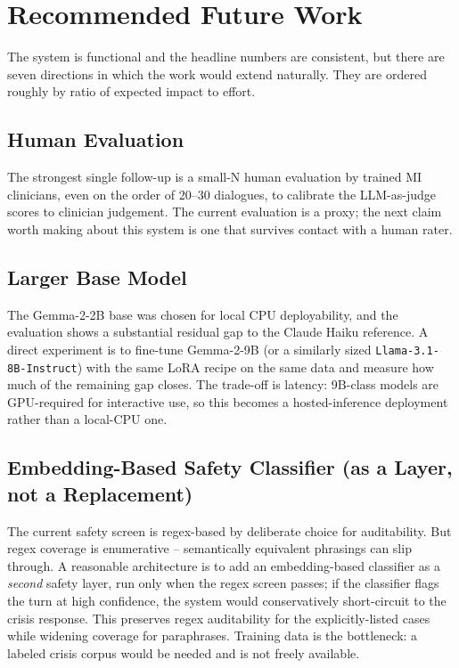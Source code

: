 \section{Recommended Future Work}
\label{sec:future_work}

The system is functional and the headline numbers are consistent, but there
are seven directions in which the work would extend naturally. They are
ordered roughly by ratio of expected impact to effort.

\subsection{Human Evaluation}
The strongest single follow-up is a small-N human evaluation by trained MI
clinicians, even on the order of 20--30 dialogues, to calibrate the
LLM-as-judge scores to clinician judgement. The current evaluation is a
proxy; the next claim worth making about this system is one that survives
contact with a human rater.

\subsection{Larger Base Model}
The Gemma-2-2B base was chosen for local CPU deployability, and the
evaluation shows a substantial residual gap to the Claude Haiku reference.
A direct experiment is to fine-tune Gemma-2-9B (or a similarly sized
\texttt{Llama-3.1-8B-Instruct}) with the same LoRA recipe on the same data
and measure how much of the remaining gap closes. The trade-off is latency:
9B-class models are GPU-required for interactive use, so this becomes a
hosted-inference deployment rather than a local-CPU one.

\subsection{Embedding-Based Safety Classifier (as a Layer, not a Replacement)}
The current safety screen is regex-based by deliberate choice for
auditability. But regex coverage is enumerative -- semantically equivalent
phrasings can slip through. A reasonable architecture is to add an
embedding-based classifier as a \emph{second} safety layer, run only when
the regex screen passes; if the classifier flags the turn at high confidence,
the system would conservatively short-circuit to the crisis response. This
preserves regex auditability for the explicitly-listed cases while widening
coverage for paraphrases. Training data is the bottleneck: a labeled crisis
corpus would be needed and is not freely available.

